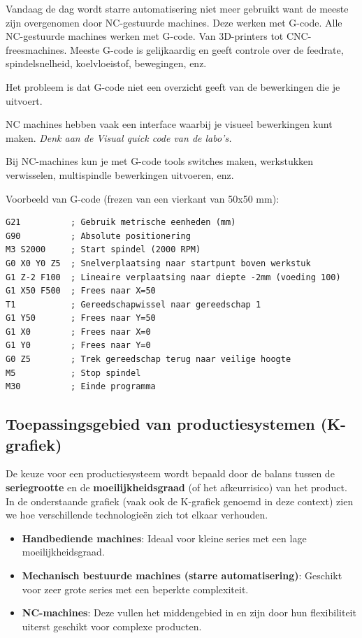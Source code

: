 \documentclass[a4paper,12pt,twoside]{report}
\begin{document}
Vandaag de dag wordt starre automatisering niet meer gebruikt want 
de meeste zijn overgenomen door NC-gestuurde machines.
Deze werken met G-code. Alle NC-gestuurde machines werken met G-code.
Van 3D-printers tot CNC-freesmachines. Meeste G-code is gelijkaardig en
geeft controle over de feedrate, spindelsnelheid, koelvloeistof, bewegingen, enz.

Het probleem is dat G-code niet een overzicht geeft van de bewerkingen die je uitvoert.

NC machines hebben vaak een interface waarbij je visueel bewerkingen kunt maken.
\textit{Denk aan de Visual quick code van de labo's.}

Bij NC-machines kun je met G-code tools switches maken, werkstukken verwisselen,
multispindle bewerkingen uitvoeren, enz.


Voorbeeld van G-code (frezen van een vierkant van 50x50 mm):
\begin{tcolorbox}[colback=black!5,colframe=black!50,title=G-code Voorbeeld]
	\begin{verbatim}
G21          ; Gebruik metrische eenheden (mm)
G90          ; Absolute positionering
M3 S2000     ; Start spindel (2000 RPM)
G0 X0 Y0 Z5  ; Snelverplaatsing naar startpunt boven werkstuk
G1 Z-2 F100  ; Lineaire verplaatsing naar diepte -2mm (voeding 100)
G1 X50 F500  ; Frees naar X=50
T1 			 ; Gereedschapwissel naar gereedschap 1
G1 Y50       ; Frees naar Y=50
G1 X0        ; Frees naar X=0
G1 Y0        ; Frees naar Y=0
G0 Z5        ; Trek gereedschap terug naar veilige hoogte
M5           ; Stop spindel
M30          ; Einde programma
\end{verbatim}
\end{tcolorbox}


\subsection{Toepassingsgebied van productiesystemen (K-grafiek)}
De keuze voor een productiesysteem wordt bepaald door de balans tussen de \textbf{seriegrootte} en de \textbf{moeilijkheidsgraad} (of het afkeurrisico) van het product. In de onderstaande grafiek (vaak ook de K-grafiek genoemd in deze context) zien we hoe verschillende technologieën zich tot elkaar verhouden.

\begin{itemize}
	\item \textbf{Handbediende machines}: Ideaal voor kleine series met een lage moeilijkheidsgraad.
	\item \textbf{Mechanisch bestuurde machines (starre automatisering)}: Geschikt voor zeer grote series met een beperkte complexiteit.
	\item \textbf{NC-machines}: Deze vullen het middengebied in en zijn door hun flexibiliteit uiterst geschikt voor complexe producten.
\end{itemize}
\end{document}
